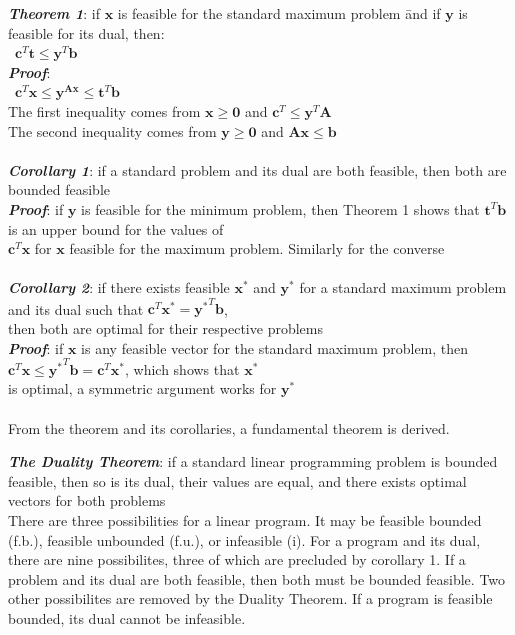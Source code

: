 \documentclass[10pt,letterpaper]{scrartcl}
\newcommand{\boph}[1]{\emph{\textbf{#1}}} %
\begin{document}
\begin{tabbing}
\boph{Theorem 1}: if $\mathbf{x}$ is feasible for the standard maximum problem \= and if $\mathbf{y}$ is feasible for its dual, then: \\
\>\ $\mathbf{c}^T\mathbf{t}\leq\mathbf{y}^T\mathbf{b}$ \\
\boph{Proof}: \\
\>\ $\mathbf{c}^T\mathbf{x}\leq\mathbf{y}^\mathbf{Ax}\leq\mathbf{t}^T\mathbf{b}$ \\
The first inequality comes from $\mathbf{x}\geq \mathbf{0}$ and $\mathbf{c}^T\leq\mathbf{y}^T\mathbf{A}$ \\
The second inequality comes from $\mathbf{y}\geq\mathbf{0}$ and $\mathbf{Ax}\leq\mathbf{b}$ \\ \\
\boph{Corollary 1}: if a standard problem and its dual are both feasible, then both are bounded feasible \\
\boph{Proof}: if $\mathbf{y}$ is feasible for the minimum problem, then Theorem 1 shows that $\mathbf{t}^T\mathbf{b}$ is an upper bound for the values of \\ $\mathbf{c}^T\mathbf{x}$ for $\mathbf{x}$ feasible for the maximum problem. Similarly for the converse \\ \\
\boph{Corollary 2}: if there exists feasible $\mathbf{x^{*}}$ and $\mathbf{y^{*}}$ for a standard maximum problem and its dual such that $\mathbf{c}^T\mathbf{x^{*}}=\mathbf{y^{*}}^T\mathbf{b}$, \\ then both are optimal for their respective problems \\
\boph{Proof}: if $\mathbf{x}$ is any feasible vector for the standard maximum problem, then $\mathbf{c}^T\mathbf{x}\leq\mathbf{y^{*}}^T\mathbf{b}=\mathbf{c}^T\mathbf{x^{*}}$, which shows that $\mathbf{x^{*}}$ \\ is optimal, a symmetric argument works for $\mathbf{y^{*}}$\\ \\
From the theorem and its corollaries, a fundamental theorem is derived.\end{tabbing}
\boph{The Duality Theorem}: if a standard linear programming problem is bounded feasible, then so is its dual, their values are equal, and there exists optimal vectors for both problems \\
There are three possibilities for a linear program. It may be feasible bounded (f.b.), feasible unbounded (f.u.), or infeasible (i). For a program and its dual, there are nine possibilites, three of which are precluded by corollary 1. If a problem and its dual are both feasible, then both must be bounded feasible. Two other possibilites are removed by the Duality Theorem. If a program is feasible bounded, its dual cannot be infeasible. \\
\end{document}

